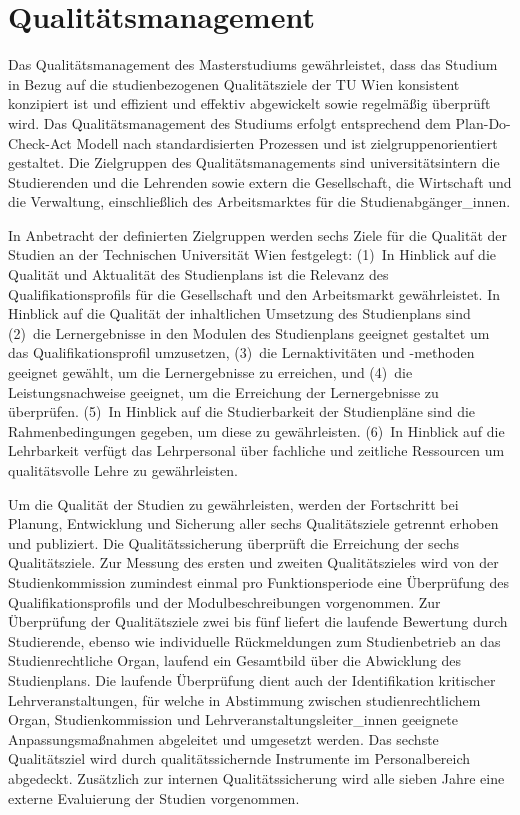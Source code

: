 \section{Qualitätsmanagement}\label{sec:IQ}

Das Qualitätsmanagement des Masterstudiums \emph{}
gewährleistet, dass das Studium in Bezug auf die studienbezogenen
Qualitätsziele der TU Wien konsistent konzipiert ist und effizient und
effektiv abgewickelt sowie regelmäßig überprüft wird. Das
Qualitätsmanagement des Studiums erfolgt entsprechend dem
Plan-Do-Check-Act Modell nach standardisierten Prozessen und ist
zielgruppenorientiert gestaltet. Die Zielgruppen des
Qualitätsmanagements sind universitätsintern die Studierenden und die
Lehrenden sowie extern die Gesellschaft, die Wirtschaft und die
Verwaltung, einschließlich des Arbeitsmarktes für die
Studienabgänger\_innen. 
\medskip

In Anbetracht der definierten Zielgruppen werden sechs Ziele für die
Qualität der Studien an der Technischen Universität Wien festgelegt:
(1)~In Hinblick auf die Qualität und Aktualität des
Studienplans ist die Relevanz des Qualifikationsprofils für die
Gesellschaft und den Arbeitsmarkt gewährleistet. In Hinblick auf die
Qualität der inhaltlichen Umsetzung des Studienplans sind (2)~die
Lernergebnisse in den Modulen des Studienplans geeignet gestaltet um
das Qualifikationsprofil umzusetzen, (3)~die Lernaktivitäten und
-methoden geeignet gewählt, um die Lernergebnisse zu erreichen, und
(4)~die Leistungsnachweise geeignet, um die Erreichung der
Lernergebnisse zu überprüfen.  (5)~In Hinblick auf die Studierbarkeit
der Studienpläne sind die Rahmenbedingungen gegeben, um diese zu
gewährleisten.  (6)~In Hinblick auf die Lehrbarkeit verfügt das
Lehrpersonal über fachliche und zeitliche Ressourcen um qualitätsvolle
Lehre zu gewährleisten.
\medskip

Um die Qualität der Studien zu gewährleisten, werden der Fortschritt
bei Planung, Entwicklung und Sicherung aller sechs Qualitätsziele
getrennt erhoben und publiziert.  Die Qualitätssicherung überprüft die
Erreichung der sechs Qualitätsziele. Zur Messung des ersten und
zweiten Qualitätszieles wird von der Studienkommission zumindest
einmal pro Funktionsperiode eine Überprüfung des Qualifikationsprofils
und der Modulbeschreibungen vorgenommen. Zur Überprüfung der
Qualitätsziele zwei bis fünf liefert die laufende Bewertung durch
Studierende, ebenso wie individuelle Rückmeldungen zum Studienbetrieb
an das Studienrechtliche Organ, laufend ein Gesamtbild über die
Abwicklung des Studienplans. Die laufende Überprüfung dient auch der
Identifikation kritischer Lehrveranstaltungen, für welche in
Abstimmung zwischen stu\-dienrechtlichem Organ, Studienkommission und
Lehrveranstaltungsleiter\_innen geeignete Anpassungsmaßnahmen abgeleitet 
und umgesetzt werden. Das sechste Qualitätsziel wird durch qualitätssichernde 
Instrumente im Personalbereich abgedeckt. Zusätzlich zur internen 
Qualitätssicherung wird alle sieben Jahre eine externe Evaluierung der Studien
vorgenommen.

